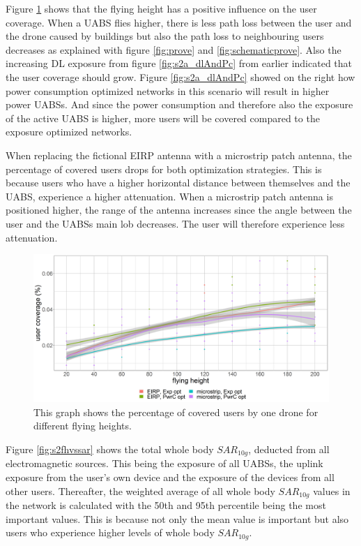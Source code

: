 Figure  \ref{fig:s2fhvscov} shows that the flying height has a positive influence on the user coverage. 
When a \gls{UABS} flies higher, there is less path loss between the user and the drone caused by buildings but also the path loss to neighbouring 
users decreases as explained 
with figure \ref{fig:prove} and \ref{fig:schematicprove}. 
Also the increasing \gls{DL} exposure  from figure \ref{fig:s2a_dlAndPc} from earlier indicated that the
user coverage should grow.
Figure \ref{fig:s2a_dlAndPc} showed on the right how power consumption optimized networks in this scenario will result in higher power \gls{UABS}s.
And since the power consumption and therefore also the exposure of the active \gls{UABS} is higher, more users will be covered compared to 
the exposure optimized networks.

When replacing the fictional \gls{EIRP} antenna with a microstrip patch antenna, the percentage of covered users drops for both 
optimization strategies. This is because users who have a higher horizontal distance between themselves and the \gls{UABS}, 
experience a higher attenuation. When a microstrip patch antenna is positioned higher, the range of the antenna increases 
since the angle between the user and the \gls{UABS}s main lob decreases. The user will therefore experience less attenuation.


\begin{figure}[h!]
  \includegraphics[width=\textwidth]{../results/s2/fhvscov.png}
  \caption{This graph shows the percentage of covered users by one drone for different flying heights.}
  \label{fig:s2fhvscov}
\end{figure}

Figure \ref{fig:s2fhvssar} shows the total whole body $SAR_{10g}$, deducted from all electromagnetic sources. This being the exposure of all \gls{UABS}s,
 the uplink exposure from the user’s own device and the exposure of the devices from all other users. 
 Thereafter, the weighted average of all whole body $SAR_{10g}$ values in the network is calculated with the 50th and 95th percentile 
 being the most important values. This is because not only the mean value is important but also users who experience higher 
 levels of whole body $SAR_{10g}$.

